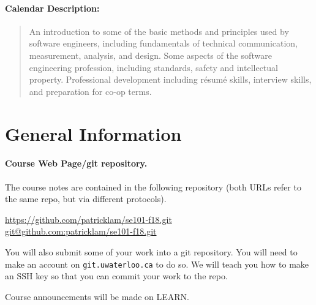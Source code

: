 \documentclass[11pt,onecolumn]{article}
\begin{document}
\paragraph{Calendar Description:}
\begin{quote}
    An introduction to some of the basic methods and principles used by software engineers, including fundamentals of technical communication, measurement, analysis, and design. Some aspects of the software engineering profession, including standards, safety and intellectual property. Professional development including r\'esum\'e skills, interview skills, and preparation for co-op terms.
\end{quote}

\section{General Information}

\paragraph{Course Web Page/git repository.} 

The course notes are contained in the following repository (both URLs
refer to the same repo, but via different protocols). 

\begin{center}
\url{https://github.com/patricklam/se101-f18.git}\\
\url{git@github.com:patricklam/se101-f18.git}
\end{center}

\noindent You will also submit some of your work into a git repository. You will
need to make an account on {\tt git.uwaterloo.ca} to do so. We will teach
you how to make an SSH key so that you can commit your work to the
repo.

\vspace*{1em} \noindent
Course announcements will be made on LEARN.


\newpage
\end{document}

